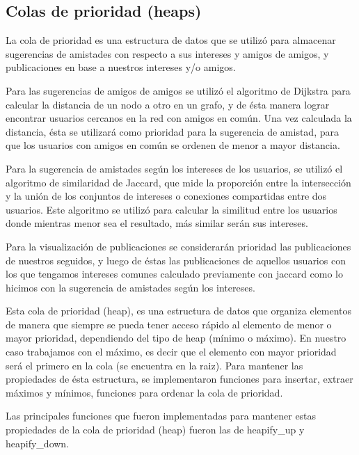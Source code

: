 \documentclass[9pt,letterpaper,onecolumn]{rho-class/rho}
\begin{document}
    \subsection{Colas de prioridad (heaps)}
    La cola de prioridad es una estructura de datos que se utilizó para almacenar sugerencias de amistades con respecto a sus intereses y amigos de amigos, y publicaciones en base a nuestros intereses y/o amigos.

    Para las sugerencias de amigos de amigos se utilizó el algoritmo de Dijkstra para calcular la distancia de un nodo a otro en un grafo, y de ésta manera lograr encontrar usuarios cercanos en la red con amigos en común. Una vez calculada la distancia, ésta se utilizará como prioridad para la sugerencia de amistad, para que los usuarios con amigos en común se ordenen de menor a mayor distancia.

    Para la sugerencia de amistades según los intereses de los usuarios, se utilizó el algoritmo de similaridad de Jaccard, que mide la proporción entre la intersección y la unión de los conjuntos de intereses o conexiones compartidas entre dos usuarios. Este algoritmo se utilizó para calcular la similitud entre los usuarios donde mientras menor sea el resultado, más similar serán sus intereses.

    Para la visualización de publicaciones se considerarán prioridad las publicaciones de nuestros seguidos, y luego de éstas las publicaciones de aquellos usuarios con los que tengamos intereses comunes calculado previamente con jaccard como lo hicimos con la sugerencia de amistades según los intereses.

    Esta cola de prioridad (heap), es una estructura de datos que organiza elementos de manera que siempre se pueda tener acceso rápido al elemento de menor o mayor prioridad, dependiendo del tipo de heap (mínimo o máximo). En nuestro caso trabajamos con el máximo, es decir que el elemento con mayor prioridad será el primero en la cola (se encuentra en la raiz). Para mantener las propiedades de ésta estructura, se implementaron funciones para insertar, extraer máximos y mínimos, funciones para ordenar la cola de prioridad.

    Las principales funciones que fueron implementadas para mantener estas propiedades de la cola de prioridad (heap) fueron las de heapify\_up y heapify\_down.
\end{document}
